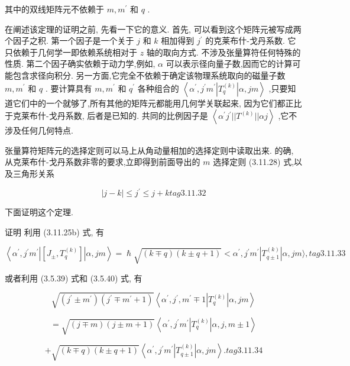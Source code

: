 其中的双线矩阵元不依赖于 $m,{m}^{\prime }$ 和 $q$ .

在阐述该定理的证明之前, 先看一下它的意义. 首先, 可以看到这个矩阵元被写成两个因子之积. 第一个因子是一个关于 $j$ 和 $k$ 相加得到 ${j}^{\prime }$ 的克莱布什-戈丹系数. 它只依赖于几何学一即依赖系统相对于 $z$ 轴的取向方式. 不涉及张量算符任何特殊的性质. 第二个因子确实依赖于动力学,例如, $\alpha$ 可以表示径向量子数,因而它的计算可能包含求径向积分. 另一方面,它完全不依赖于确定该物理系统取向的磁量子数 $m,{m}^{\prime }$ 和 $q$ . 要计算具有 $m,{m}^{\prime }$ 和 ${q}^{\prime }$ 各种组合的 $\left\langle {{\alpha }^{\prime },{j}^{\prime }{m}^{\prime }\left| {T}_{q}^{\left( k\right) }\right| \alpha ,{jm}}\right\rangle$ ,只要知道它们中的一个就够了,所有其他的矩阵元都能用几何学关联起来, 因为它们都正比于克莱布什-戈丹系数, 后者是已知的. 共同的比例因子是 $\left\langle {{\alpha }^{\prime }{j}^{\prime }\left| \right| {T}^{\left( k\right) }\left| \right| {\alpha j}}\right\rangle$ ,它不涉及任何几何特点.

张量算符矩阵元的选择定则可以马上从角动量相加的选择定则中读取出来. 的确, 从克莱布什-戈丹系数非零的要求,立即得到前面导出的 $m$ 选择定则 (3.11.28) 式,以及三角形关系

$$
\left| {j - k}\right| \leq {j}^{\prime } \leq j + k tag{3.11.32}
$$

下面证明这个定理.

证明 利用 (3.11.25b) 式, 有

$$
\left\langle {{\alpha }^{\prime },{j}^{\prime }{m}^{\prime }\left| \left\lbrack {{J}_{ \pm },{T}_{q}^{\left( k\right) }}\right\rbrack \right| \alpha ,{jm}}\right\rangle = \hslash \sqrt{\left( {k \mp q}\right) \left( {k \pm q + 1}\right) } < {\alpha }^{\prime },{j}^{\prime }{m}^{\prime }\left| {T}_{q \pm 1}^{\left( k\right) }\right| \alpha ,{jm}\rangle , tag{3.11.33}
$$

或者利用 (3.5.39) 式和 (3.5.40) 式, 有

$$
\sqrt{\left( {{j}^{\prime } \pm {m}^{\prime }}\right) \left( {{j}^{\prime } \mp {m}^{\prime } + 1}\right) }\left\langle {{\alpha }^{\prime },{j}^{\prime },{m}^{\prime } \mp 1\left| {T}_{q}^{\left( k\right) }\right| \alpha ,{jm}}\right\rangle
$$

$$
= \sqrt{\left( {j \mp m}\right) \left( {j \pm m + 1}\right) }\left\langle {{\alpha }^{\prime },{j}^{\prime }{m}^{\prime }\left| {T}_{q}^{\left( k\right) }\right| \alpha, j, m \pm 1}\right\rangle
$$

$$
+ \sqrt{\left( {k \mp q}\right) \left( {k \pm q + 1}\right) }\left\langle {{\alpha }^{\prime },{j}^{\prime }{m}^{\prime }\left| {T}_{q \pm 1}^{\left( k\right) }\right| \alpha ,{jm}}\right\rangle . tag{3.11.34}
$$

